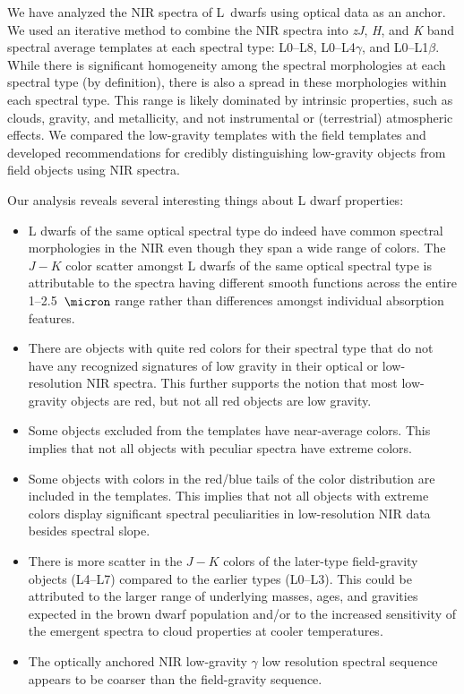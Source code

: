 \documentclass[12pt]{aastex6}
\begin{document}
We have analyzed the NIR spectra of L~dwarfs using optical data as an anchor.
We used an iterative method to combine the NIR spectra into \emph{zJ}, \emph{H}, and \emph{K} band spectral average templates at each spectral type: L0--L8, L0--L4$\gamma$, and L0--L1$\beta$.
While there is significant homogeneity among the spectral morphologies at each spectral type (by definition), there is also a spread in these morphologies within each spectral type.
This range is likely dominated by intrinsic properties, such as clouds, gravity, and metallicity, and not instrumental or (terrestrial) atmospheric effects.
We compared the low-gravity templates with the field templates and developed recommendations for credibly distinguishing low-gravity objects from field objects using NIR spectra.

Our analysis reveals several interesting things about L dwarf properties:
\begin{itemize}
	\item L dwarfs of the same optical spectral type do indeed have common spectral morphologies in the NIR even though they span a wide range of colors. The $J-K$ color scatter amongst L dwarfs of the same optical spectral type is attributable to the spectra having different smooth functions across the entire 1--2.5~$\micron$ range rather than differences amongst individual absorption features.
	\item There are objects with quite red colors for their spectral type that do not have any recognized signatures of low gravity in their optical or low-resolution NIR spectra. This further supports the notion that most low-gravity objects are red, but not all red objects are low gravity.
	\item Some objects excluded from the templates have near-average colors. This implies that not all objects with peculiar spectra have extreme colors.
	\item Some objects with colors in the red/blue tails of the color distribution are included in the templates. This implies that not all objects with extreme colors display significant spectral peculiarities in low-resolution NIR data besides spectral slope.
	\item There is more scatter in the $J-K$ colors of the later-type field-gravity objects (L4--L7) compared to the earlier types (L0--L3). This could be attributed to the larger range of underlying masses, ages, and gravities expected in the brown dwarf population and/or to the increased sensitivity of the emergent spectra to cloud properties at cooler temperatures.
	\item The optically anchored NIR low-gravity $\gamma$ low resolution spectral sequence appears to be coarser than the field-gravity sequence.
\end{itemize}
\end{document}

